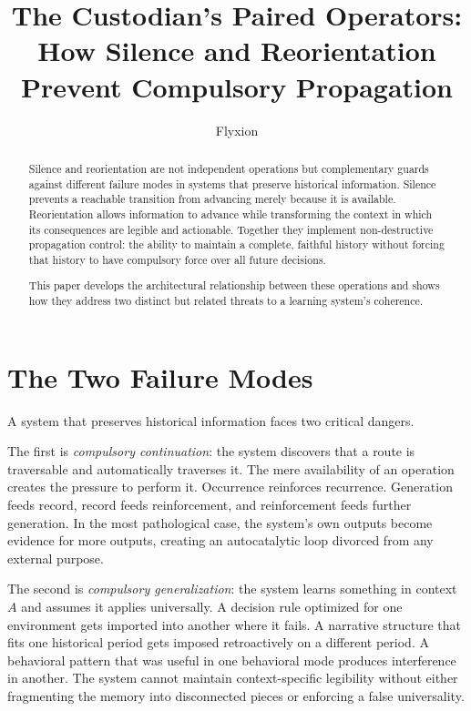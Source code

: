 \documentclass[12pt]{article}
\title{The Custodian's Paired Operators: \\How Silence and Reorientation Prevent Compulsory Propagation}
\author{Flyxion}
\date{}
\begin{document}
\maketitle

\begin{abstract}

Silence and reorientation are not independent operations but complementary guards against different failure modes in systems that preserve historical information. Silence prevents a reachable transition from advancing merely because it is available. Reorientation allows information to advance while transforming the context in which its consequences are legible and actionable. Together they implement non-destructive propagation control: the ability to maintain a complete, faithful history without forcing that history to have compulsory force over all future decisions.

This paper develops the architectural relationship between these operations and shows how they address two distinct but related threats to a learning system's coherence.

\end{abstract}

\section{The Two Failure Modes}

A system that preserves historical information faces two critical dangers.

The first is \textit{compulsory continuation}: the system discovers that a route is traversable and automatically traverses it. The mere availability of an operation creates the pressure to perform it. Occurrence reinforces recurrence. Generation feeds record, record feeds reinforcement, and reinforcement feeds further generation. In the most pathological case, the system's own outputs become evidence for more outputs, creating an autocatalytic loop divorced from any external purpose.

The second is \textit{compulsory generalization}: the system learns something in context $A$ and assumes it applies universally. A decision rule optimized for one environment gets imported into another where it fails. A narrative structure that fits one historical period gets imposed retroactively on a different period. A behavioral pattern that was useful in one behavioral mode produces interference in another. The system cannot maintain context-specific legibility without either fragmenting the memory into disconnected pieces or enforcing a false universality.
\end{document}
